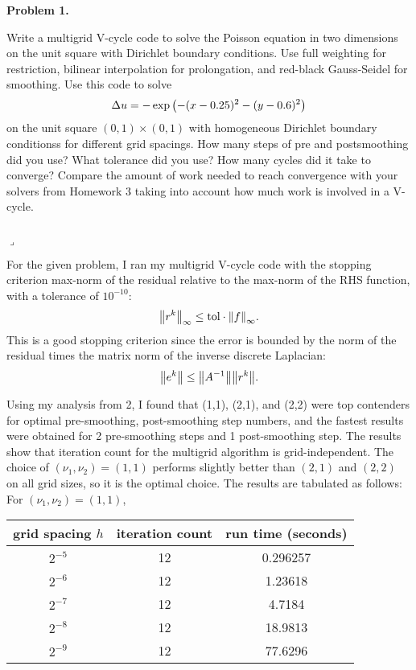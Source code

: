 \documentclass[12pt]{article}
\newenvironment{myprob}[1]
    {%
    \noindent{\Huge$\ulcorner$}\textbf{#1.}\begin{em}
    }
    { 
    \end{em} \\ \hphantom{l} \hfill {\Huge$\lrcorner$} }
\begin{document}
\rhead{\today}

{\let\newpage\relax} 


\begin{myprob}{Problem 1}
Write a multigrid V-cycle code to solve the Poisson equation in two dimensions on the unit square with Dirichlet boundary conditions. Use full weighting for restriction, bilinear interpolation for prolongation, and red-black Gauss-Seidel for smoothing.
Use this code to solve
$$\Delta u = -\exp\qty( - (x-0.25)^2 - (y-0.6)^2)$$
on the unit square $(0, 1) \times (0, 1)$ with homogeneous Dirichlet boundary conditionss for different grid spacings. How many steps of pre and postsmoothing did you use? What tolerance did you use? How many cycles did it take to converge? Compare the amount of work needed to reach convergence with your solvers from Homework 3 taking into account how much work is involved in a V-cycle.
\end{myprob}

For the given problem, I ran my multigrid V-cycle code with the stopping criterion
max-norm of the residual relative to the max-norm of the RHS function, with a tolerance of $10^{-10}$:
$$\norm{r^k}_\infty \leq \text{tol}\cdot \norm{f}_\infty.$$
This is a good stopping criterion since the error is bounded by the norm of the residual times the matrix norm of the inverse discrete Laplacian:
$$\norm{e^k} \leq \norm{A^{-1}} \norm{r^k}.$$ 

 Using my analysis from 2, I found that (1,1), (2,1), and (2,2) were top contenders for optimal pre-smoothing, post-smoothing step numbers, and the fastest results were obtained for 2 pre-smoothing steps and 1 post-smoothing step. The results show that iteration count for the multigrid algorithm is grid-independent. The choice of $(\nu_1, \nu_2) = (1,1)$ performs slightly better than $(2,1)$ and $(2,2)$ on all grid sizes, so it is the optimal choice. The results are tabulated as follows: \\
For $(\nu_1, \nu_2) = (1,1)$,  \\
\begin{center}
\begin{tabular}{||c|c|c||}
\hline \hline
   grid spacing $h$ &   iteration count &   run time (seconds) \\
\hline \hline
       $2^{-5}$    &  12 &  0.296257 \\
       $2^{-6}$   &   12 &  1.23618    \\
       $2^{-7}$  &  12 &  4.7184  \\
       $2^{-8}$ &  12 & 18.9813   \\
       $2^{-9}$ & 12 & 77.6296 \\
\hline \hline
\end{tabular}
\end{center}
\end{document}
